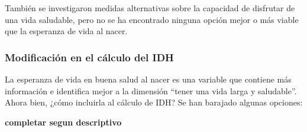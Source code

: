 \documentclass[
  10pt,
]{article}
\begin{document}
También se investigaron medidas alternativas sobre la capacidad de
disfrutar de una vida saludable, pero no se ha encontrado ninguna opción
mejor o más viable que la esperanza de vida al nacer.

\hypertarget{modificaciuxf3n-en-el-cuxe1lculo-del-idh}{%
\subsubsection{Modificación en el cálculo del
IDH}\label{modificaciuxf3n-en-el-cuxe1lculo-del-idh}}

La esperanza de vida en buena salud al nacer es una variable que
contiene más información e identifica mejor a la dimensión ``tener una
vida larga y saludable''. Ahora bien, ¿cómo incluirla al cálculo de IDH?
Se han barajado algunas opciones:

\textbf{completar segun descriptivo}
\end{document}
